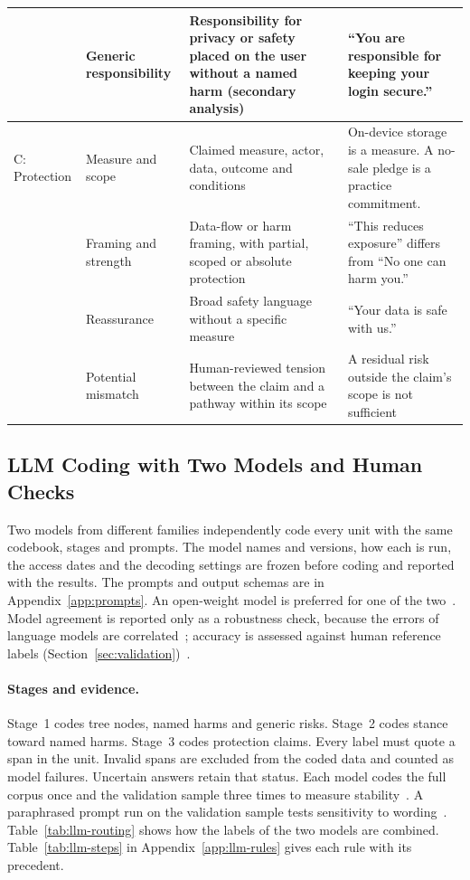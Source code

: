 \begin{table}[!t]
\begin{singlespace}
\begin{tabularx}{\textwidth}{@{}L{1.6cm}L{2.8cm}>{\raggedright\arraybackslash}X>{\raggedright\arraybackslash}X@{}}
\rowrule
 & Generic responsibility & Responsibility for privacy or safety placed on the user without a named harm (secondary analysis)
  & \enquote{You are responsible for keeping your login secure.} \\
\midrule
C: Protection & Measure and scope & Claimed measure, actor, data, outcome and conditions
  & On-device storage is a measure. A no-sale pledge is a practice commitment. \\
\rowrule
 & Framing and strength & Data-flow or harm framing, with partial, scoped or absolute protection
  & \enquote{This reduces exposure} differs from \enquote{No one can harm you.} \\
\rowrule
 & Reassurance & Broad safety language without a specific measure
  & \enquote{Your data is safe with us.} \\
\rowrule
 & Potential mismatch & Human-reviewed tension between the claim and a pathway within its scope
  & A residual risk outside the claim's scope is not sufficient \\
\bottomrule
\end{tabularx}
\end{singlespace}
\end{table}

\subsection{LLM Coding with Two Models and Human Checks}
\label{sec:llm}
Two models from different families independently code every unit with the same codebook, stages
and prompts. The model names and versions, how each is run, the access dates and the decoding
settings are frozen before coding and reported with the results. The prompts and output
schemas are in Appendix~\ref{app:prompts}. An open-weight model is preferred for one of the two~\parencite{tornberg2024best}.
Model agreement is reported only as a robustness check, because the errors of language models
are correlated~\parencite{kim2025correlated}; accuracy is assessed against human reference labels
(Section~\ref{sec:validation})~\parencite{egami2023using,pangakis2023automated}.

\paragraph{Stages and evidence.} Stage~1 codes tree nodes, named harms and generic risks.
Stage~2 codes stance toward named harms. Stage~3 codes protection claims. Every label must quote
a span in the unit. Invalid spans are excluded from the coded data and counted as model
failures. Uncertain answers retain that status. Each model codes the full corpus once and the
validation sample three times to measure
stability~\parencite[\S4.3, pp.~3888--3889]{rodriguez2024llm}. A paraphrased prompt run on the
validation sample tests sensitivity to wording~\parencite{baumann2025llm}.
Table~\ref{tab:llm-routing} shows how the labels of the two models are combined.
Table~\ref{tab:llm-steps} in Appendix~\ref{app:llm-rules} gives each rule with its precedent.

